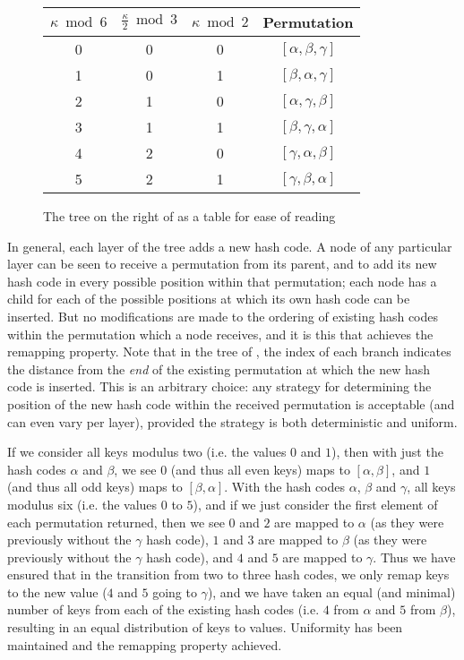 \documentclass[runningheads,a4paper]{llncs}
\begin{document}
\begin{figure}
\begin{center}
\begin{tabular}{|c|c|c|c|}
\hline $\kappa \bmod 6$ & $\frac{\kappa}{2} \bmod 3$ & $\kappa \bmod 2$ & Permutation \\
\hline 0 & 0 & 0 & $[\alpha,\beta,\gamma]$ \\
\hline 1 & 0 & 1 & $[\beta,\alpha,\gamma]$ \\
\hline 2 & 1 & 0 & $[\alpha,\gamma,\beta]$ \\
\hline 3 & 1 & 1 & $[\beta,\gamma,\alpha]$ \\
\hline 4 & 2 & 0 & $[\gamma,\alpha,\beta]$ \\
\hline 5 & 2 & 1 & $[\gamma,\beta,\alpha]$ \\\hline
\end{tabular}
\end{center}
\caption{The tree on the right of  as a table for ease of reading}
\label{fig:tree-3-table}
\end{figure}

In general, each layer of the tree adds a new hash code. A node of any
particular layer can be seen to receive a permutation from its parent,
and to add its new hash code in every possible position within that
permutation; each node has a child for each of the possible positions
at which its own hash code can be inserted. But no modifications are
made to the ordering of existing hash codes within the permutation
which a node receives, and it is this that achieves the remapping
property. Note that in the tree of , the index of
each branch indicates the distance from the {\em end} of the existing
permutation at which the new hash code is inserted. This is an
arbitrary choice: any strategy for determining the position of the new
hash code within the received permutation is acceptable (and can even
vary per layer), provided the strategy is both deterministic and
uniform.

If we consider all keys modulus two (i.e. the values $0$ and $1$),
then with just the hash codes $\alpha$ and $\beta$, we see $0$ (and
thus all even keys) maps to $[\alpha,\beta]$, and $1$ (and thus all
odd keys) maps to $[\beta,\alpha]$. With the hash codes $\alpha$,
$\beta$ and $\gamma$, all keys modulus six (i.e. the values $0$ to
$5$), and if we just consider the first element of each permutation
returned, then we see $0$ and $2$ are mapped to $\alpha$ (as they were
previously without the $\gamma$ hash code), $1$ and $3$ are mapped to
$\beta$ (as they were previously without the $\gamma$ hash code), and
$4$ and $5$ are mapped to $\gamma$. Thus we have ensured that in the
transition from two to three hash codes, we only remap keys to the new
value ($4$ and $5$ going to $\gamma$), and we have taken an equal (and
minimal) number of keys from each of the existing hash codes (i.e. $4$
from $\alpha$ and $5$ from $\beta$), resulting in an equal
distribution of keys to values. Uniformity has been maintained and the
remapping property achieved.
\end{document}
